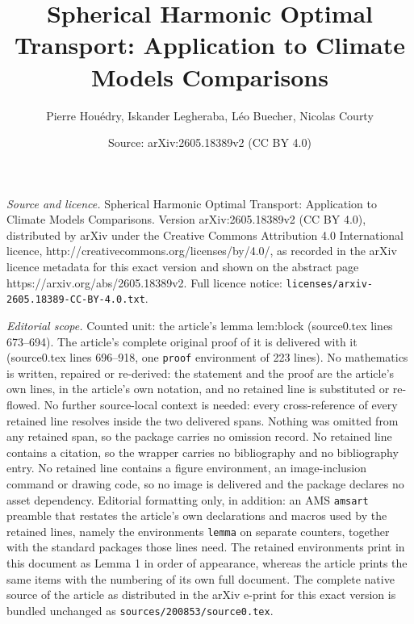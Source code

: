 \documentclass[10pt,a4paper]{amsart}
\title{Spherical Harmonic Optimal Transport: Application to Climate Models Comparisons}
\author{Pierre Hou\'edry, Iskander Legheraba, L\'eo Buecher, Nicolas Courty}
\date{Source: arXiv:2605.18389v2 (CC BY 4.0)}
\begin{document}
\maketitle

\noindent\emph{Source and licence.} Spherical Harmonic Optimal Transport: Application to Climate Models Comparisons. Version arXiv:2605.18389v2 (CC BY 4.0), distributed by arXiv under the Creative Commons Attribution 4.0 International licence, http://creativecommons.org/licenses/by/4.0/, as recorded in the arXiv licence metadata for this exact version and shown on the abstract page https://arxiv.org/abs/2605.18389v2. Full licence notice: \texttt{licenses/arxiv-2605.18389-CC-BY-4.0.txt}.\par\smallskip

\noindent\textit{Editorial scope.} Counted unit: the article's lemma lem:block (source0.tex lines 673--694). The article's complete original proof of it is delivered with it (source0.tex lines 696--918, one \texttt{proof} environment of 223 lines). No mathematics is written, repaired or re-derived: the statement and the proof are the article's own lines, in the article's own notation, and no retained line is substituted or re-flowed.  No further source-local context is needed: every cross-reference of every retained line resolves inside the two delivered spans.  Nothing was omitted from any retained span, so the package carries no omission record.  No retained line contains a citation, so the wrapper carries no bibliography and no bibliography entry.  No retained line contains a figure environment, an image-inclusion command or drawing code, so no image is delivered and the package declares no asset dependency.  Editorial formatting only, in addition: an AMS \texttt{amsart} preamble that restates the article's own declarations and macros used by the retained lines, namely the environments \texttt{lemma} on separate counters, together with the standard packages those lines need.  The retained environments print in this document as Lemma 1 in order of appearance, whereas the article prints the same items with the numbering of its own full document.  The complete native source of the article as distributed in the arXiv e-print for this exact version is bundled unchanged as \texttt{sources/200853/source0.tex}.
\end{document}
